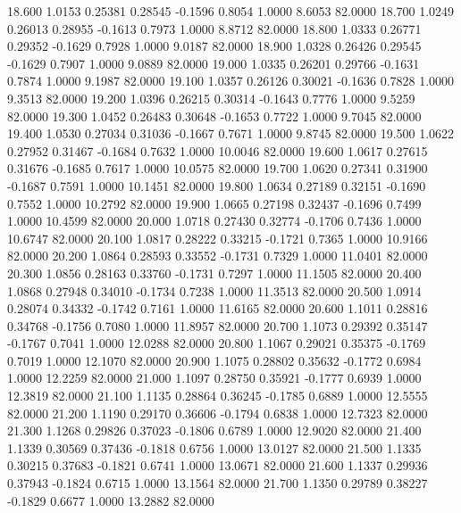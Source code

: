   18.600   1.0153   0.25381   0.28545  -0.1596   0.8054   1.0000   8.6053  82.0000
  18.700   1.0249   0.26013   0.28955  -0.1613   0.7973   1.0000   8.8712  82.0000
  18.800   1.0333   0.26771   0.29352  -0.1629   0.7928   1.0000   9.0187  82.0000
  18.900   1.0328   0.26426   0.29545  -0.1629   0.7907   1.0000   9.0889  82.0000
  19.000   1.0335   0.26201   0.29766  -0.1631   0.7874   1.0000   9.1987  82.0000
  19.100   1.0357   0.26126   0.30021  -0.1636   0.7828   1.0000   9.3513  82.0000
  19.200   1.0396   0.26215   0.30314  -0.1643   0.7776   1.0000   9.5259  82.0000
  19.300   1.0452   0.26483   0.30648  -0.1653   0.7722   1.0000   9.7045  82.0000
  19.400   1.0530   0.27034   0.31036  -0.1667   0.7671   1.0000   9.8745  82.0000
  19.500   1.0622   0.27952   0.31467  -0.1684   0.7632   1.0000  10.0046  82.0000
  19.600   1.0617   0.27615   0.31676  -0.1685   0.7617   1.0000  10.0575  82.0000
  19.700   1.0620   0.27341   0.31900  -0.1687   0.7591   1.0000  10.1451  82.0000
  19.800   1.0634   0.27189   0.32151  -0.1690   0.7552   1.0000  10.2792  82.0000
  19.900   1.0665   0.27198   0.32437  -0.1696   0.7499   1.0000  10.4599  82.0000
  20.000   1.0718   0.27430   0.32774  -0.1706   0.7436   1.0000  10.6747  82.0000
  20.100   1.0817   0.28222   0.33215  -0.1721   0.7365   1.0000  10.9166  82.0000
  20.200   1.0864   0.28593   0.33552  -0.1731   0.7329   1.0000  11.0401  82.0000
  20.300   1.0856   0.28163   0.33760  -0.1731   0.7297   1.0000  11.1505  82.0000
  20.400   1.0868   0.27948   0.34010  -0.1734   0.7238   1.0000  11.3513  82.0000
  20.500   1.0914   0.28074   0.34332  -0.1742   0.7161   1.0000  11.6165  82.0000
  20.600   1.1011   0.28816   0.34768  -0.1756   0.7080   1.0000  11.8957  82.0000
  20.700   1.1073   0.29392   0.35147  -0.1767   0.7041   1.0000  12.0288  82.0000
  20.800   1.1067   0.29021   0.35375  -0.1769   0.7019   1.0000  12.1070  82.0000
  20.900   1.1075   0.28802   0.35632  -0.1772   0.6984   1.0000  12.2259  82.0000
  21.000   1.1097   0.28750   0.35921  -0.1777   0.6939   1.0000  12.3819  82.0000
  21.100   1.1135   0.28864   0.36245  -0.1785   0.6889   1.0000  12.5555  82.0000
  21.200   1.1190   0.29170   0.36606  -0.1794   0.6838   1.0000  12.7323  82.0000
  21.300   1.1268   0.29826   0.37023  -0.1806   0.6789   1.0000  12.9020  82.0000
  21.400   1.1339   0.30569   0.37436  -0.1818   0.6756   1.0000  13.0127  82.0000
  21.500   1.1335   0.30215   0.37683  -0.1821   0.6741   1.0000  13.0671  82.0000
  21.600   1.1337   0.29936   0.37943  -0.1824   0.6715   1.0000  13.1564  82.0000
  21.700   1.1350   0.29789   0.38227  -0.1829   0.6677   1.0000  13.2882  82.0000
